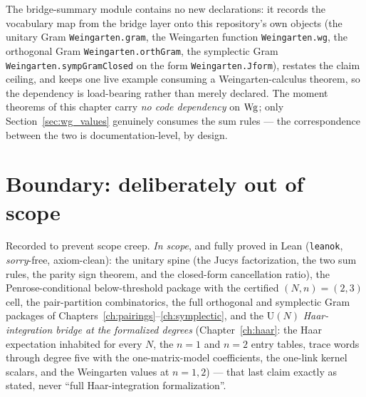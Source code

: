 \begin{remark}\label{rem:bridge_summary}
\leanok
{}
The bridge-summary module contains no new declarations: it records the
vocabulary map from the bridge layer onto this repository's own
objects (the unitary Gram \texttt{Weingarten.gram}, the Weingarten
function \texttt{Weingarten.wg}, the orthogonal Gram
\texttt{Weingarten.orthGram}, the symplectic Gram
\texttt{Weingarten.sympGramClosed} on the form \texttt{Weingarten.Jform}),
restates the claim ceiling, and keeps one live example consuming a
Weingarten-calculus theorem, so the dependency is load-bearing rather
than merely declared. The moment theorems of this chapter carry
\emph{no code dependency} on $\operatorname{Wg}$; only
Section~\ref{sec:wg_values} genuinely consumes the sum rules --- the
correspondence between the two is documentation-level, by design.
\end{remark}

\chapter{Boundary: deliberately out of scope}\label{ch:boundary}

Recorded to prevent scope creep. \emph{In scope}, and fully proved in Lean
(\texttt{leanok}, \emph{sorry}-free, axiom-clean): the unitary spine (the Jucys
factorization, the two sum rules, the parity sign theorem, and the closed-form
cancellation ratio), the Penrose-conditional below-threshold package with the
certified $(N,n)=(2,3)$ cell, the pair-partition combinatorics, the full
orthogonal and symplectic Gram packages of
Chapters~\ref{ch:pairings}--\ref{ch:symplectic}, and the $\mathrm U(N)$
\emph{Haar-integration bridge at the formalized degrees}
(Chapter~\ref{ch:haar}: the Haar expectation inhabited for every $N$, the
$n=1$ and $n=2$ entry tables, trace words through degree five with the
one-matrix-model coefficients, the one-link kernel scalars, and the
Weingarten values at $n=1,2$) --- that last claim exactly as stated,
never ``full Haar-integration formalization''.

